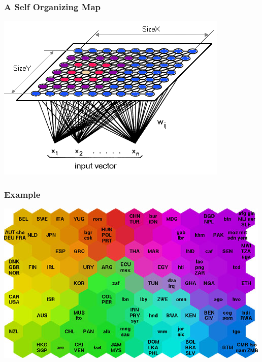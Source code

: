 \documentclass{beamer}
\begin{document}

\begin{frame}
  \frametitle{A Self Organizing Map}

  \centering
  \href{https://codesachin.wordpress.com/2015/11/28/self-organizing-maps-with-googles-tensorflow/}{\includegraphics[width=\linewidth]{kohonen1}}

\end{frame}


\begin{frame}
  \frametitle{Example}

  \centering
  \href{http://www.ai-junkie.com/ann/som/som5.html}{\includegraphics[width=\linewidth]{povertymap}}

\end{frame}
\end{document}
